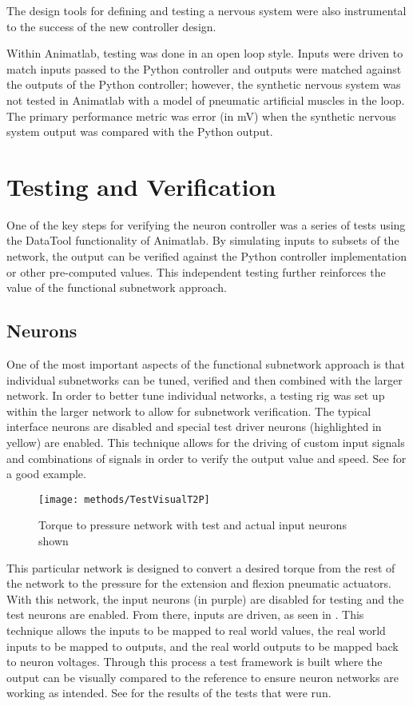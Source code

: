 The design tools for defining and testing a nervous system were also instrumental
to the success of the new controller design.

Within Animatlab, testing was done in an open loop style. Inputs were driven to match inputs passed to the Python controller and outputs were matched against the outputs of the Python controller; however, the synthetic nervous system was not tested in Animatlab with a model of pneumatic artificial muscles in the loop. The primary performance metric was error (in mV) when the synthetic nervous system output was compared with the Python output.

\section{Testing and Verification}

One of the key steps for verifying the neuron controller was a series of tests
using the DataTool functionality of Animatlab. By simulating inputs to subsets
of the network, the output can be verified against the Python controller
implementation or other pre-computed values. This independent testing further
reinforces the value of the functional subnetwork approach.

\subsection{Neurons}

One of the most important aspects of the functional subnetwork approach is that
individual subnetworks can be tuned, verified and then combined with the larger
network. In order to better tune individual networks, a testing rig was set up
within the larger network to allow for subnetwork verification. The typical
interface neurons are disabled and special test driver neurons (highlighted in
yellow) are enabled. This technique allows for the driving of custom input signals and
combinations of signals in order to verify the output value and speed. 
See  for a good example.

\begin{figure}
\centering
\texttt{[image: methods/TestVisualT2P]}
\caption{Torque to pressure network with test and actual input neurons shown}
\label{fig:TestNetworkT2P}
\end{figure}

This particular network is designed to convert a desired torque from the rest
of the network to the pressure for the extension and flexion pneumatic actuators.
With this network, the input neurons (in purple)
are disabled for testing and the test neurons are enabled. From there, inputs
are driven, as seen in . This technique allows the inputs to 
be mapped to real world values, the real world inputs to be mapped to outputs, 
and the real world outputs to be mapped back to neuron voltages. Through this
process a test framework is built where the output can be visually compared to the 
reference to ensure neuron networks are working as intended. See 
 for the results of the tests that were run.

